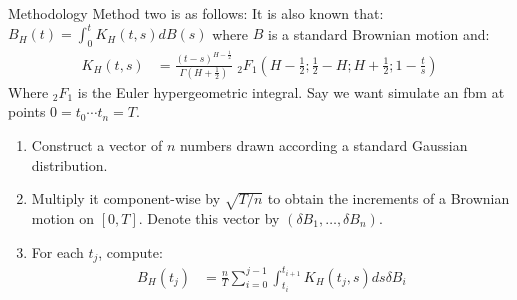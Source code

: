 \documentclass[12pt]{article}
\theoremstyle{definition}
\numberwithin{equation}{section}
\numberwithin{example}{section}
\begin{document}
\begin{section}{Methodology}
	Method two is as follows:
	It is also known that: $B_H (t)=\int_0^t K_H(t,s) dB(s)$
	where $B$ is a standard Brownian motion and: 
	\begin{align}
		K_H(t,s)&=\frac{(t-s)^{H-\frac{1}{2}}}{\Gamma(H+\frac{1}{2})} \;_2F_1
		\left (H-\frac{1}{2}; \frac{1}{2}-H; H+\frac{1}{2}; 1-\frac{t}{s}
		\right)
	\end{align}
	Where $ _2F_1$ is the Euler hypergeometric integral.
	Say we want simulate an fbm at points $0=t_0\cdots t_n = T$.
	\begin{enumerate}
		\item Construct a vector of $n$ numbers drawn according a
			standard Gaussian distribution.
		\item Multiply it component-wise by $\sqrt{T/n}$ to obtain the increments
			of a Brownian motion on $[0,T]$. Denote this vector by
			$ (\delta B_1, \ldots, \delta B_n)$.
		\item For each $ t_j$, compute:
			\begin{align}
				B_H (t_j)&=\frac{n}{T}\sum_{i=0}^{j-1}  \int_{t_i}^{t_{i+1}}
				K_H(t_j, s) ds \delta B_i
			\end{align}
	\end{enumerate}
\end{section}
\end{document}
